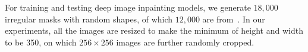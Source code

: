 \documentclass[10pt,journal,compsoc]{IEEEtran}
\begin{document}





For training and testing deep image inpainting models, we generate $18,000$ irregular masks with random shapes, of which $12,000$ are from~\cite{partialconv2017}.
%
In our experiments, all the images are resized to make the minimum of height and width to be 350, on which $256\times256$ images are further randomly cropped.
%


\end{document}
